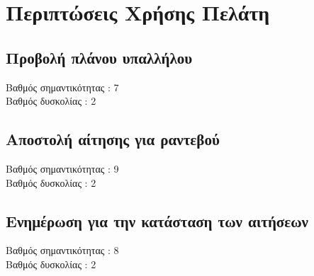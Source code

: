 \documentclass[12pt]{article}
\begin{document}
\section {Περιπτώσεις Χρήσης Πελάτη}
\subsection{Προβολή πλάνου υπαλλήλου}
Βαθμός σημαντικότητας : 7
\\[0.3cm]
Βαθμός δυσκολίας : 2 

\subsection{Αποστολή αίτησης για ραντεβού}
Βαθμός σημαντικότητας : 9
\\[0.3cm]
Βαθμός δυσκολίας :  2

\subsection{Ενημέρωση για την κατάσταση των αιτήσεων}
Βαθμός σημαντικότητας : 8
\\[0.3cm]
Βαθμός δυσκολίας : 2 
\end{document}
